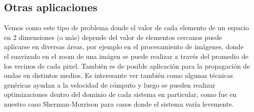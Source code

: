\subsection{Otras aplicaciones}

Vemos como este tipo de problema donde el valor de cada elemento de un espacio en 2 dimensiones (o más) depende del valor de elementos cercanos puede aplicarse en diversas áreas, por ejemplo en el procesamiento de imágenes, donde el suavizado en el zoom de una imágen se puede realizar a través del promedio de los vecinos de cada pixel. También es de posible aplicación para la propagación de ondas en distintos medios. Es interesante ver también como algunas técnicas genéricas ayudan a la velocidad de cómputo y luego se pueden realizar optimizaciones dentro del dominio de cada sistema en particular, como fue en nuestro caso Sherman-Morrison para casos donde el sistema varía levemente.
